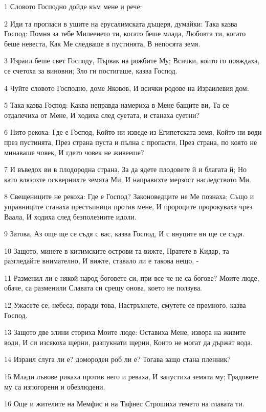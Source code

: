 \par 1 Словото Господно дойде към мене и рече:
\par 2 Иди та прогласи в ушите на ерусалимската дъщеря, думайки: Така казва Господ: Помня за тебе Милеенето ти, когато беше млада, Любовта ти, когато беше невеста, Как Ме следваше в пустинята, В непосята земя.
\par 3 Израил беше свет Господу, Първак на рожбите Му; Всички, които го пояждаха, се счетоха за виновни; Зло ги постигаше, казва Господ.
\par 4 Чуйте словото Господно, доме Яковов, И всички родове на Израилевия дом:
\par 5 Така казва Господ: Каква неправда намериха в Мене бащите ви, Та се отдалечиха от Мене, И ходиха след суетата, и станаха суетни?
\par 6 Нито рекоха: Где е Господ, Който ни изведе из Египетската земя, Който ни води през пустинята, През страна пуста и пълна с пропасти, През страна, по която не минаваше човек, И гдето човек не живееше?
\par 7 И въведох ви в плодородна страна, За да ядете плодовете й и благата й; Но като влязохте осквернихте земята Ми, И направихте мерзост наследството Ми.
\par 8 Свещениците не рекоха: Где е Господ? Законоведците не Ме познаха; Също и управниците станаха престъпници против мене, И пророците пророкуваха чрез Ваала, И ходиха след безполезните идоли.
\par 9 Затова, Аз още ще се съдя с вас, казва Господ, И с внуците ви ще се съдя.
\par 10 Защото, минете в китимските острови та вижте, Пратете в Кидар, та разгледайте внимателно, И вижте, ставало ли е такова нещо, -
\par 11 Разменил ли е някой народ боговете си, при все че не са богове? Моите люде, обаче, са разменили Славата си срещу онова, което не ползува.
\par 12 Ужасете се, небеса, поради това, Настръхнете, смутете се премного, казва Господ.
\par 13 Защото две злини сториха Моите люде: Оставиха Мене, извора на живите води, И си изсякоха щерни, разпукнати щерни, Които не могат да държат вода.
\par 14 Израил слуга ли е? домороден роб ли е? Тогава защо стана пленник?
\par 15 Млади лъвове рикаха против него и реваха, И запустиха земята му; Градовете му са изпогорени и обезлюдени.
\par 16 Още и жителите на Мемфис и на Тафнес Строшиха темето на главата ти.
